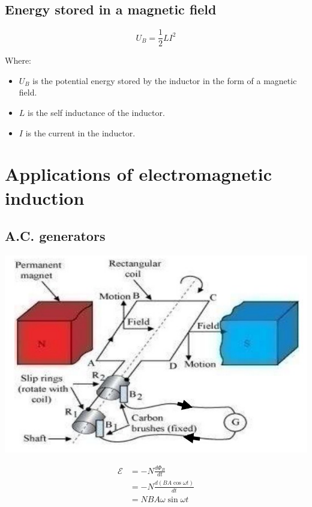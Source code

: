 \documentclass[11pt]{article}
\begin{document}
\subsection{Energy stored in a magnetic field}
\label{sec:org570884c}
\[U_B = \frac{1}{2} L I^2\]

Where:
\begin{itemize}
\item \(U_B\) is the potential energy stored by the inductor in the form of a magnetic field.
\item \(L\) is the self inductance of the inductor.
\item \(I\) is the current in the inductor.
\end{itemize}

\newpage

\section{Applications of electromagnetic induction}
\label{sec:org28c9846}

\subsection{A.C. generators}
\label{sec:orge0fd543}
\begin{center}
\includegraphics[width=.9\linewidth]{./images/ac-generator.png}
\end{center}

\begin{align*}
\mathcal{E} &= -N \frac{d \Phi_B}{dt} \\
&= -N \frac{d(BA \cos \omega t)}{dt} \\
&= NBA \omega \sin \omega t
\end{align*}
\end{document}
